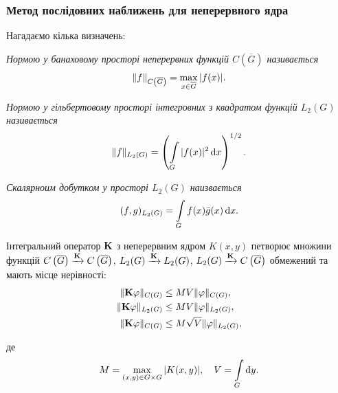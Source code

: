 \subsubsection{Метод послідовних наближень для неперервного ядра}

Нагадаємо кілька визначень:

\begin{definition}
	\it{Нормою} у банаховому просторі неперервних функцій $C\left(\overline G\right)$ називається
	\begin{equation}
		\|f\|_{C\left(\overline G\right)} = \Max_{x \in \overline G} |f(x)|.
	\end{equation}
\end{definition}

\begin{definition}[норми у $L_2(G)$]
	\it{Нормою} у гільбертовому просторі інтегровних з квадратом функцій $L_2(G)$ називається
	\begin{equation}
		\|f\|_{L_2(G)} = \left( \Int_G |f(x)|^2 \diff x \right)^{1/2}.
	\end{equation}
\end{definition}

\begin{definition}
	\it{Скалярноим добутком} у просторі $L_2(G)$ наизвається
	\begin{equation}
		(f, g)_{L_2(G)} = \Int_G f(x) \bar g(x) \diff x.
	\end{equation}
\end{definition}

\begin{lemma} 
	\label{lemma:2.1.4}
	Інтегральний оператор $\bf{K}$ з неперервним ядром $K(x, y)$ петворює множини функцій $C\left(\overline G\right) \xrightarrow{\bf{K}} C\left(\overline G\right)$, $L_2(G) \xrightarrow{\bf{K}} L_2(G)$, $L_2(G) \xrightarrow{\bf{K}} C\left(\overline G\right)$ обмежений та мають місце нерівності:
	\begin{align}
		\| \bf{K} \phi \|_{C(G)} &\le M V \| \phi \|_{C(G)}, \\
		\| \bf{K} \phi \|_{L_2(G)} &\le M V \| \phi \|_{L_2(G)}, \\
		\| \bf{K} \phi \|_{C(G)} &\le M \sqrt{V} \| \phi \|_{L_2(G)},
	\end{align}

	де
	\begin{equation}
		M = \Max_{(x, y) \in G \times G} |K(x, y)|, \quad V = \Int_G \diff y.
	\end{equation}
\end{lemma}

